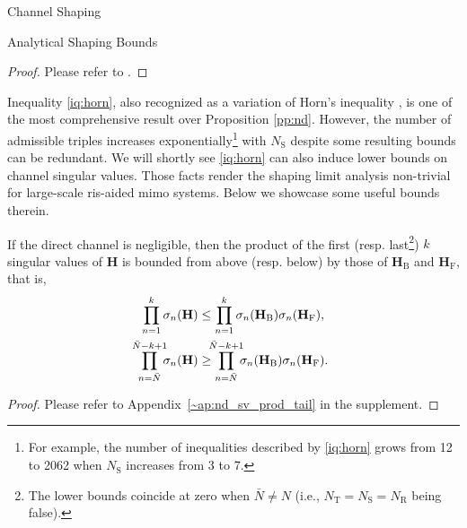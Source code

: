 \documentclass[journal]{IEEEtran}
\begin{document}
\begin{section}{Channel Shaping}
\begin{subsection}{Analytical Shaping Bounds}
		\begin{proof}
			Please refer to \cite[Theorem~8]{Fulton2000}.
		\end{proof}

		Inequality \eqref{iq:horn}, also recognized as a variation of Horn's inequality \cite{Bhatia2001}, is one of the most comprehensive result over Proposition \ref{pp:nd}.
		However, the number of admissible triples increases exponentially\footnote{For example, the number of inequalities described by \eqref{iq:horn} grows from 12 to 2062 when $N_\mathrm{S}$ increases from 3 to 7.} with $N_\mathrm{S}$ despite some resulting bounds can be redundant.
		We will shortly see \eqref{iq:horn} can also induce lower bounds on channel singular values.
		Those facts render the shaping limit analysis non-trivial for large-scale \gls{ris}-aided \gls{mimo} systems.
		Below we showcase some useful bounds therein.

		\begin{corollary}
			\label{co:nd_sv_prod_tail}
			If the direct channel is negligible,
			then the product of the first (resp. last\footnote{The lower bounds coincide at zero when $\bar{N} \ne N$ (i.e., $N_\mathrm{T} = N_\mathrm{S} = N_\mathrm{R}$ being false).}) $k$ singular values of $\mathbf{H}$ is bounded from above (resp. below) by those of $\mathbf{H}_\mathrm{B}$ and $\mathbf{H}_\mathrm{F}$, that is,
			\begin{subequations}
				\begin{align}
					\prod_{n=1}^k \sigma_n(\mathbf{H})                   & \le \prod_{n=1}^k \sigma_n(\mathbf{H}_\mathrm{B}) \sigma_n(\mathbf{H}_\mathrm{F}), \label{iq:sv_nd_prod_largest}                    \\
					\prod_{n=\bar{N}}^{\mathclap{\bar{N}-k+1}} \sigma_n(\mathbf{H}) & \ge \prod_{n=\bar{N}}^{\mathclap{\bar{N}-k+1}} \sigma_n(\mathbf{H}_\mathrm{B}) \sigma_n(\mathbf{H}_\mathrm{F}). \label{iq:sv_nd_prod_smallest}
				\end{align}
			\end{subequations}
		\end{corollary}

		\begin{proof}
			Please refer to Appendix~\ref{~ap:nd_sv_prod_tail} in the supplement.
		\end{proof}


\end{subsection}
\end{section}
\end{document}
